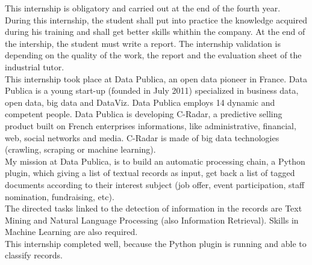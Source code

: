 This internship is obligatory and carried out at the end of the fourth year. During this internship, the student shall put into practice the knowledge acquired during his training and shall get better skills whithin the company. At the end of the intership, the student must write a report. The internship validation is depending on the quality of the work, the report and the evaluation sheet of the industrial tutor.\\
This internship took place at Data Publica, an open data pioneer in France. Data Publica is a young start-up (founded in July 2011) specialized in business data, open data, big data and DataViz. Data Publica employs 14 dynamic and competent people. Data Publica is developing C-Radar, a predictive selling product built on French enterprises informations, like administrative, financial, web, social networks and media. C-Radar is made of big data technologies (crawling, scraping or machine learning).\\
My mission at Data Publica, is to build an automatic processing chain, a Python plugin, which giving a list of textual records as input, get back a list of tagged documents according to their interest subject (job offer, event participation, staff nomination, fundraising, etc).\\
The directed tasks linked to the detection of information in the records are Text Mining and Natural Language Processing (also Information Retrieval). Skills in Machine Learning are also required.\\
This internship completed well, because the Python plugin is running and able to classify records.